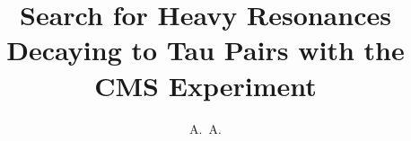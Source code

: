 \documentclass[defaultstyle,11pt]{thesis}
\title{Search for Heavy Resonances Decaying to Tau Pairs with the CMS Experiment}
\author{A.~A.}{Johnson}
\begin{document}





%
%
%
%
%
%
%
%
%
%
%

\nocite{*}		%

\appendix
%
%
\end{document}
